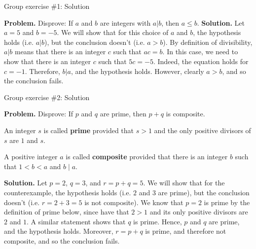\documentclass[10pt]{beamer}
\begin{document}
\begin{frame}{Group exercise \#1: Solution}

\textbf{Problem.} Disprove: If $a$ and $b$ are integers with $a|b$, then $a \leq b$.
\vfill 
\pause 
\textbf{Solution.} Let $a=5$ and $b=-5$. We will show that for this choice of $a$ and $b$, the hypothesis holds (i.e. $a|b$), but the conclusion doesn't (i.e. $a>b$).  By definition of divisibility, $a|b$ means that there is an integer $c$ such that $ac =b$. In this case, we need to show that there is an integer $c$ such that  $5c=-5$.  Indeed, the equation holds for $c=-1$.  Therefore, $b|a$, and the hypothesis holds.  However, clearly $a>b$, and so the conclusion fails. 
\end{frame}


\begin{frame}{Group exercise \#2: Solution}

\textbf{Problem.} Disprove: If $p$ and $q$ are prime, then $p+q$ is composite. \pause 
% 
\vspace{-.1cm}
%
\begin{mygreenbox}[title=Reference: Scheinerman Def. 3.5]
An integer $s$ is called \textbf{prime} provided that $s>1$ and the only positive divisors of $s$ are $1$ and $s$. 
\end{mygreenbox}
\begin{mygreenbox}[title=Reference: Scheinerman Def. 3.6]
A positive integer $a$ is called \textbf{composite} provided that there is an integer $b$  such that $1<b<a$ and $b \mid a$. 
\end{mygreenbox}
%
\vspace{-.2cm}
%
\pause 
\textbf{Solution.}  Let $p=2$, $q=3$, and $r=p+q=5$.  We will show that for the counterexample, the hypothesis holds (i.e. $2$ and $3$ are prime), but the conclusion doesn't (i.e. $r=2 + 3 = 5$ is not composite). We know that $p=2$ is prime by the definition of prime below, since have that $2>1$ and its only positive divisors are $2$ and $1$.  A similar statement shows that $q$ is prime.  Hence, $p$ and $q$ are prime, and the hypothesis holds.  Moreover, $r=p+q$ is prime, and therefore not composite, and so the conclusion fails.


   
\end{frame}
\end{document}
